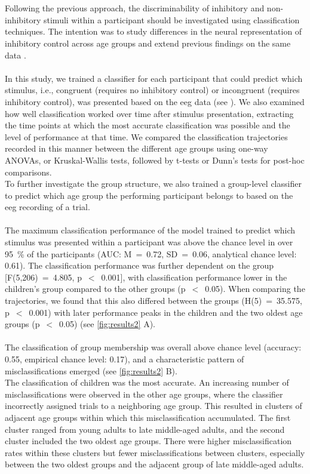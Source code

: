 \hyperref[pub:paperII]{}\\
\\
Following the previous approach, the discriminability of inhibitory and non-inhibitory stimuli within a participant should be investigated using classification techniques. The intention was to study differences in the neural representation of inhibitory control across age groups and extend previous findings on the same data \cite{Reuter2019}.\\
\\
In this study, we trained a classifier for each participant that could predict which stimulus, i.e., congruent (requires no inhibitory control) or incongruent (requires inhibitory control), was presented based on the \gls{eeg} data (see ). We also examined how well classification worked over time after stimulus presentation, extracting the time points at which the most accurate classification was possible and the level of performance at that time. We compared the classification trajectories recorded in this manner between the different age groups using one-way ANOVAs, or Kruskal-Wallis tests, followed by t-tests or Dunn's tests for post-hoc comparisons.\\
To further investigate the group structure, we also trained a group-level classifier to predict which age group the performing participant belongs to based on the \gls{eeg} recording of a trial.\\
\\
The maximum classification performance of the model trained to predict which stimulus was presented within a participant was above the chance level in over 95~\% of the participants (AUC: M~=~0.72, SD~=~0.06, analytical chance level: 0.61). The classification performance was further dependent on the group [F(5,206)~=~4.805, p~$<$~0.001], with classification performance lower in the children's group compared to the other groups (p~$<$~0.05). When comparing the trajectories, we found that this also differed between the groups (H(5)~=~35.575, p~$<$~0.001) with later performance peaks in the children and the two oldest age groups (p~$<$~0.05) (see \autoref{fig:results2} A).\\
\\
The classification of group membership was overall above chance level (accuracy: 0.55, empirical chance level: 0.17), and a characteristic pattern of misclassifications emerged (see \autoref{fig:results2} B).\\
The classification of children was the most accurate. An increasing number of misclassifications were observed in the other age groups, where the classifier incorrectly assigned trials to a neighboring age group. This resulted in clusters of adjacent age groups within which this misclassification accumulated. The first cluster ranged from young adults to late middle-aged adults, and the second cluster included the two oldest age groups. There were higher misclassification rates within these clusters but fewer misclassifications between clusters, especially between the two oldest groups and the adjacent group of late middle-aged adults.\\
